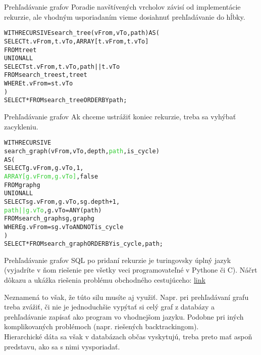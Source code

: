 \documentclass[12pt]{beamer}
\def\blue#1{\textcolor{Cerulean}{#1}}
\def\green#1{\textcolor{LimeGreen}{#1}}
\begin{document}
\begin{frame}[fragile]{Prehľadávanie grafov}
Poradie navštívených vrcholov závisí od implementácie rekurzie,
ale vhodným usporiadaním vieme dosiahnuť \alert{prehľadávanie do hĺbky}.
\bigskip
\begin{alltt}
WITH RECURSIVE search_tree(vFrom, vTo, \alert{path}) AS (
    SELECT t.vFrom, t.vTo, \alert{ARRAY[t.vFrom, t.vTo]}
    FROM tree t
  UNION ALL
    SELECT st.vFrom, t.vTo, \alert{path || t.vTo}
    FROM search_tree st, tree t
    WHERE t.vFrom = st.vTo
)
SELECT * FROM search_tree \alert{ORDER BY path};
\end{alltt}
\end{frame}

\begin{frame}[fragile]{Prehľadávanie grafov}
Ak chceme ustrážiť koniec rekurzie, treba sa vyhýbať \alert{zacykleniu}.
\bigskip
{\small
\begin{alltt}
WITH RECURSIVE
    search_graph(vFrom, vTo, depth, \green{path}, \blue{is_cycle})
AS (
    SELECT g.vFrom, g.vTo, 1,
        \green{ARRAY[g.vFrom, g.vTo]}, \blue{false}
    FROM graph g
  UNION ALL
    SELECT sg.vFrom, g.vTo, sg.depth + 1,
        \green{path || g.vTo}, \blue{g.vTo = ANY(path)}
    FROM search_graph sg, graph g
    WHERE g.vFrom = sg.vTo AND \blue{NOT is_cycle}
)
SELECT * FROM search_graph ORDER BY is_cycle, path;
\end{alltt}
}
\end{frame}

\begin{frame}[fragile]{Prehľadávanie grafov}
SQL po pridaní rekurzie je turingovsky úplný jazyk
(vyjadríte v ňom riešenie pre všetky veci programovateľné v Pythone či C).
Náčrt dôkazu a ukážka riešenia problému obchodného cestujúceho:
\href{https://cdn.oreillystatic.com/en/assets/1/event/27/High%20Performance%20SQL%20with%20PostgreSQL%20Presentation.pdf}{link}
\\[5mm]
\pause

Neznamená to však, že túto silu musíte aj využiť.
Napr. pri prehľadávaní grafu treba zvážiť, či nie je jednoduchšie vypýtať si celý graf
z databázy a prehľadávanie zapísať ako program vo vhodnejšom jazyku.
Podobne pri iných komplikovaných problémoch (napr. riešených backtrackingom).\\[5mm]

Hierarchické dáta sa však v databázach občas vyskytujú, treba preto mať aspoň predstavu, ako sa s nimi vysporiadať.
\end{frame}
\end{document}
